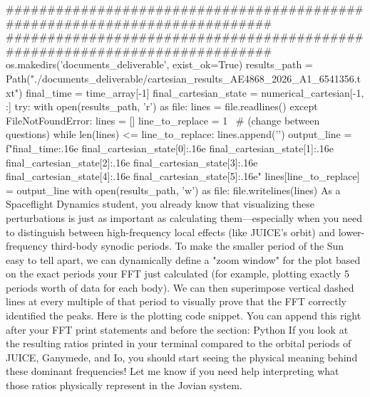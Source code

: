 {}###########################################################################\markdownRendererInterblockSeparator
{}
\markdownRendererSectionEnd \markdownRendererSectionBegin
{}\markdownRendererInterblockSeparator
{}########################################################################### os.makedirs('documents_deliverable', exist_ok=True) results_path = Path("./documents_deliverable/cartesian_results_AE4868_2026_A1_6541356.txt") final_time = time_array[-1] final_cartesian_state = numerical_cartesian[-1, :] try: with open(results_path, 'r') as file: lines = file.readlines() except FileNotFoundError: lines = [] line_to_replace = 1  # (change between questions) while len(lines) <= line_to_replace: lines.append('\n') output_line = f"{final_time:.16e} {final_cartesian_state[0]:.16e} {final_cartesian_state[1]:.16e} {final_cartesian_state[2]:.16e} {final_cartesian_state[3]:.16e} {final_cartesian_state[4]:.16e} {final_cartesian_state[5]:.16e}\n" lines[line_to_replace] = output_line with open(results_path, 'w') as file: file.writelines(lines)\markdownRendererInterblockSeparator
{}\markdownRendererSectionBegin
{}\markdownRendererInterblockSeparator
{}As a Spaceflight Dynamics student, you already know that visualizing these perturbations is just as important as calculating them—especially when you need to distinguish between high-frequency local effects (like JUICE's orbit) and lower-frequency third-body synodic periods.\markdownRendererInterblockSeparator
{}To make the smaller period of the Sun easy to tell apart, we can dynamically define a "zoom window" for the plot based on the exact periods your FFT just calculated (for example, plotting exactly 5 periods worth of data for each body). We can then superimpose vertical dashed lines at every multiple of that period to visually prove that the FFT correctly identified the peaks.\markdownRendererInterblockSeparator
{}Here is the plotting code snippet. You can append this right after your FFT print statements and before the  section:\markdownRendererInterblockSeparator
{}Python\markdownRendererInterblockSeparator
{}\markdownRendererInterblockSeparator
{}If you look at the resulting ratios printed in your terminal compared to the orbital periods of JUICE, Ganymede, and Io, you should start seeing the physical meaning behind these dominant frequencies! Let me know if you need help interpreting what those ratios physically represent in the Jovian system.\markdownRendererInterblockSeparator
